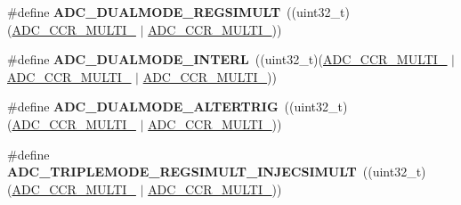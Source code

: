 \begin{DoxyCompactItemize}
\item 
\#define {\bfseries A\+D\+C\+\_\+\+D\+U\+A\+L\+M\+O\+D\+E\+\_\+\+R\+E\+G\+S\+I\+M\+U\+LT}~((uint32\+\_\+t)(\hyperlink{group___peripheral___registers___bits___definition_gae6a5be6cff1227431b8d54dffcc1ce88}{A\+D\+C\+\_\+\+C\+C\+R\+\_\+\+M\+U\+L\+T\+I\+\_} $\vert$ \hyperlink{group___peripheral___registers___bits___definition_ga8781dec7f076b475b85f8470aee94d06}{A\+D\+C\+\_\+\+C\+C\+R\+\_\+\+M\+U\+L\+T\+I\+\_}))\hypertarget{group___a_d_c_ex___common__mode_ga5318d363b48a4244335cdafaed0d179c}{}\label{group___a_d_c_ex___common__mode_ga5318d363b48a4244335cdafaed0d179c}

\item 
\#define {\bfseries A\+D\+C\+\_\+\+D\+U\+A\+L\+M\+O\+D\+E\+\_\+\+I\+N\+T\+E\+RL}~((uint32\+\_\+t)(\hyperlink{group___peripheral___registers___bits___definition_gae6a5be6cff1227431b8d54dffcc1ce88}{A\+D\+C\+\_\+\+C\+C\+R\+\_\+\+M\+U\+L\+T\+I\+\_} $\vert$ \hyperlink{group___peripheral___registers___bits___definition_ga8781dec7f076b475b85f8470aee94d06}{A\+D\+C\+\_\+\+C\+C\+R\+\_\+\+M\+U\+L\+T\+I\+\_} $\vert$ \hyperlink{group___peripheral___registers___bits___definition_gae4e7104ce01e3a79b8f6138d87dc3684}{A\+D\+C\+\_\+\+C\+C\+R\+\_\+\+M\+U\+L\+T\+I\+\_}))\hypertarget{group___a_d_c_ex___common__mode_ga29697d148e4ed75c3d2adaef0f3e1385}{}\label{group___a_d_c_ex___common__mode_ga29697d148e4ed75c3d2adaef0f3e1385}

\item 
\#define {\bfseries A\+D\+C\+\_\+\+D\+U\+A\+L\+M\+O\+D\+E\+\_\+\+A\+L\+T\+E\+R\+T\+R\+IG}~((uint32\+\_\+t)(\hyperlink{group___peripheral___registers___bits___definition_gae55be7b911b4c0272543f98a0dba5f20}{A\+D\+C\+\_\+\+C\+C\+R\+\_\+\+M\+U\+L\+T\+I\+\_} $\vert$ \hyperlink{group___peripheral___registers___bits___definition_gae4e7104ce01e3a79b8f6138d87dc3684}{A\+D\+C\+\_\+\+C\+C\+R\+\_\+\+M\+U\+L\+T\+I\+\_}))\hypertarget{group___a_d_c_ex___common__mode_ga45e63dd5e2f36e62fa1b2cb9eff891ed}{}\label{group___a_d_c_ex___common__mode_ga45e63dd5e2f36e62fa1b2cb9eff891ed}

\item 
\#define {\bfseries A\+D\+C\+\_\+\+T\+R\+I\+P\+L\+E\+M\+O\+D\+E\+\_\+\+R\+E\+G\+S\+I\+M\+U\+L\+T\+\_\+\+I\+N\+J\+E\+C\+S\+I\+M\+U\+LT}~((uint32\+\_\+t)(\hyperlink{group___peripheral___registers___bits___definition_ga5087b3cb0d4570b80b3138c277bcbf6c}{A\+D\+C\+\_\+\+C\+C\+R\+\_\+\+M\+U\+L\+T\+I\+\_} $\vert$ \hyperlink{group___peripheral___registers___bits___definition_gae4e7104ce01e3a79b8f6138d87dc3684}{A\+D\+C\+\_\+\+C\+C\+R\+\_\+\+M\+U\+L\+T\+I\+\_}))\hypertarget{group___a_d_c_ex___common__mode_gaf035650c27a3a4655c2ee42e96a277dd}{}\label{group___a_d_c_ex___common__mode_gaf035650c27a3a4655c2ee42e96a277dd}


\end{DoxyCompactItemize}
